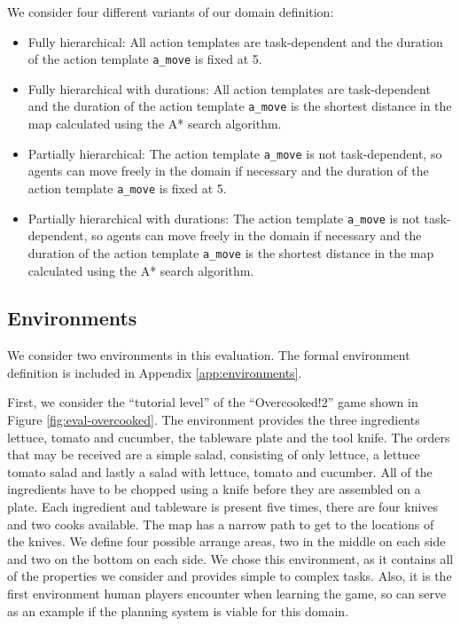 We consider four different variants of our domain definition:
\begin{itemize}
  \item Fully hierarchical: All action templates are task-dependent and the duration of the action template \verb|a_move| is fixed at 5.
  \item Fully hierarchical with durations: All action templates are task-dependent and the duration of the action template \verb|a_move| is the shortest distance in the map calculated using the A* search algorithm. 
  \item Partially hierarchical: The action template \verb|a_move| is not task-dependent, so agents can move freely in the domain if necessary and the duration of the action template \verb|a_move| is fixed at 5.
  \item Partially hierarchical with durations: The action template \verb|a_move| is not task-dependent, so agents can move freely in the domain if necessary and the duration of the action template \verb|a_move| is the shortest distance in the map calculated using the A* search algorithm. 
\end{itemize}






\subsection{Environments}

We consider two environments in this evaluation.
The formal environment definition is included in Appendix \ref{app:environments}.



First, we consider the ``tutorial level'' of the ``Overcooked!2'' game shown in Figure \ref{fig:eval-overcooked}.
The environment provides the three ingredients lettuce, tomato and cucumber, the tableware plate and the tool knife.
The orders that may be received are a simple salad, consisting of only lettuce, a lettuce tomato salad and lastly a salad with lettuce, tomato and cucumber.
All of the ingredients have to be chopped using a knife before they are assembled on a plate.
Each ingredient and tableware is present five times, there are four knives and two cooks available.
The map has a narrow path to get to the locations of the knives.
We define four possible arrange areas, two in the middle on each side and two on the bottom on each side.
We chose this environment, as it contains all of the properties we consider and provides simple to complex tasks.
Also, it is the first environment human players encounter when learning the game, so can serve as an example if the planning system is viable for this domain.

